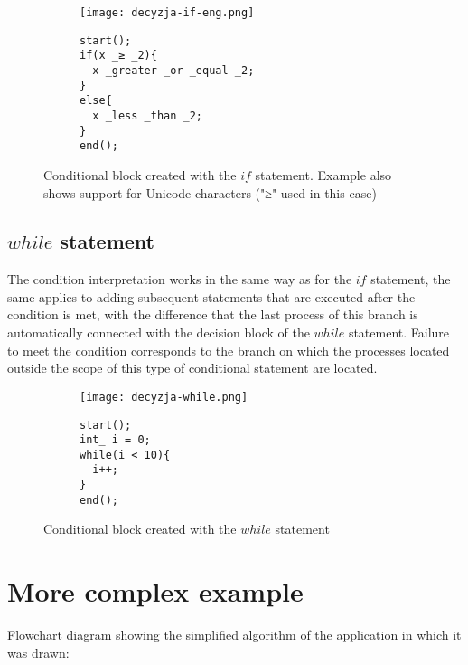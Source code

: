 \begin{figure}[H]
  \begin{subfigure}[t]{0.49\textwidth}
    \vspace{0pt}
    \centering
    \texttt{[image: decyzja-if-eng.png]}
  \end{subfigure}\hfill
  \begin{subfigure}[t]{0.44\textwidth}
    \begin{verbatim}
start();
if(x _≥ _2){
  x _greater _or _equal _2;
}
else{
  x _less _than _2;
}
end();
    \end{verbatim}
  \end{subfigure}%
  \caption{Conditional block created with the $if$ statement. Example also shows support for Unicode characters ("≥" used in this case)}
\end{figure}

		\subsection { $while$ statement } 
	
		The condition interpretation works in the same way as for the $if$ statement, the same applies to adding subsequent statements that are executed after the condition is met, with the difference that the last process of this branch is automatically connected with the decision block of the $while$ statement. Failure to meet the condition corresponds to the branch on which the processes located outside the scope of this type of conditional statement are located.
	
\begin{figure}[H]
  \begin{subfigure}[t]{0.49\textwidth}
    \vspace{0pt}
    \centering
    \texttt{[image: decyzja-while.png]}
  \end{subfigure}\hfill
  \begin{subfigure}[t]{0.44\textwidth}
    \begin{verbatim}
start();
int_ i = 0;
while(i < 10){
  i++;
}
end();
    \end{verbatim}
  \end{subfigure}%
  \caption{Conditional block created with the $while$ statement}
\end{figure}	

\section{More complex example}
Flowchart diagram showing the simplified algorithm of the application in which it was drawn: {\smallskip}


